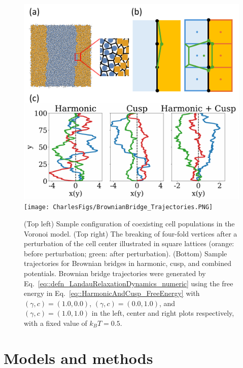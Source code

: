 \documentclass[twoside,twocolumn,9pt]{article}
\begin{document}
\begin{figure}[t]
    \centering
    \includegraphics[width=0.95\columnwidth]{Figure_methods.pdf}
    \texttt{[image: CharlesFigs/BrownianBridge\_Trajectories.PNG]}
    \caption{(Top left) Sample configuration of coexisting cell populations in the Voronoi model. (Top right) The breaking of four-fold vertices after a perturbation of the cell center illustrated in square lattices (orange: before perturbation; green: after perturbation). (Bottom) Sample trajectories for Brownian bridges in harmonic, cusp, and combined potentials. Brownian bridge trajectories were generated by Eq.~\ref{eq::defn_LandauRelaxationDynamics_numeric} using the free energy in Eq.~\ref{eq::HarmonicAndCusp_FreeEnergy} with $(\gamma,c)=(1.0,0.0)$, $(\gamma,c)=(0.0,1.0)$, and $(\gamma,c)=(1.0,1.0)$ in the left, center and right plots respectively, with a fixed value of $k_{B}T=0.5$.}
    \label{fig:methods}
\end{figure}

\section{Models and methods}
\end{document}
